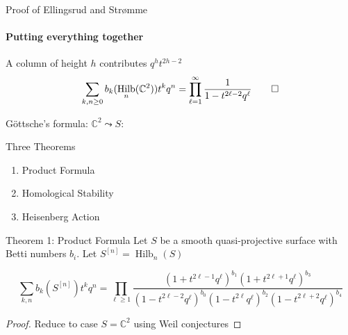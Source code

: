 \documentclass{beamer}
\DeclareMathOperator{\Hilb}{Hilb}
\newcommand{\C}{\mathbb{C}}
\begin{document}
\begin{frame}{Proof of Ellingsrud and Str\o mme}
\framesubtitle{Putting everything together}

\begin{center}
\end{center}

A column of height $h$ contributes $q^ht^{2h-2}$
$$\sum_{k,n \geq 0} b_k(\Hilb_n(\C^2))t^k q^n=\prod_{\ell=1}^\infty \frac{1}{1-t^{2\ell-2}q^\ell}\qed$$


\end{frame}

\begin{frame}[plain, c]

\begin{center}

\Huge

 G\"ottsche's formula: $\C^2\leadsto S$:
\end{center}
\begin{center}
\Huge
Three Theorems



\begin{enumerate}
\item Product Formula
\item Homological Stability
\item Heisenberg Action
\end{enumerate}
\end{center}

\end{frame}


\begin{frame}{Theorem 1: Product Formula}
Let $S$ be a smooth quasi-projective surface with Betti numbers $b_i$.  Let $S^{[n]}=\Hilb_n(S)$

\begin{Theorem}[G\"ottsche, 1990]
$$\sum_{k,n} b_k(S^{[n]})t^k q^n=\prod_{\ell\geq 1} \frac{(1+t^{2\ell-1}q^\ell)^{b_1}(1+t^{2\ell+1}q^\ell)^{b_3}}{(1-t^{2\ell-2}q^\ell)^{b_0}(1-t^{2\ell}q^\ell)^{b_2}(1-t^{2\ell+2}q^\ell)^{b_4}}$$
\end{Theorem}

\begin{proof} 
 Reduce to case $S=\C^2$ using Weil conjectures
\end{proof}

\end{frame}
\end{document}
